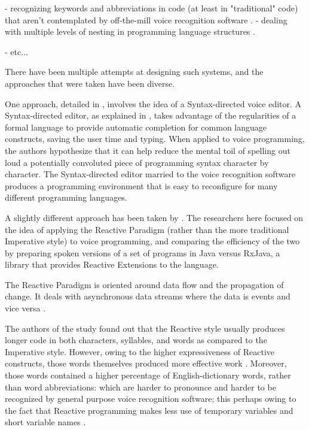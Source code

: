 - recognizing keywords and abbreviations in code (at least in "traditional" code) that aren't contemplated by off-the-mill voice recognition software \cite{arnold2000programming}.
- dealing with multiple levels of nesting in programming language structures \cite{arnold2000programming}.

- etc...

There have been multiple attempts at designing such systems, and the approaches that were taken have been diverse.

One approach, detailed in \cite{arnold2000programming}, involves the idea of a Syntax-directed voice editor. A Syntax-directed editor, as explained in \cite{arnold2000programming}, takes advantage of the regularities of a formal language to provide automatic completion for common language constructs, saving the user time and typing. When applied to voice programming, the authors hypothesize that it can help reduce the mental toil of spelling out loud a potentially convoluted piece of programming syntax character by character. The Syntax-directed editor married to the voice recognition software produces a programming environment that is easy to reconfigure for many different programming languages.

A slightly different approach has been taken by \cite{lagergren2021programming}. The researchers here focused on the idea of applying the Reactive Paradigm (rather than the more traditional Imperative style) to voice programming, and comparing the efficiency of the two by preparing spoken versions of a set of programs in Java versus RxJava, a library that provides Reactive Extensions to the language.

The Reactive Paradigm is oriented around data flow and the propagation of change. It deals with asynchronous data streams where the data is events and vice versa \cite{lagergren2021programming}.

The authors of the study found out that the Reactive style usually produces longer code in both characters, syllables, and words as compared to the Imperative style. However, owing to the higher expressiveness of Reactive constructs, those words themselves produced more effective work \cite{lagergren2021programming}. Moreover, those words contained a higher percentage of English-dictionary words, rather than word abbreviations: which are harder to pronounce and harder to be recognized by general purpose voice recognition software; this perhaps owing to the fact that Reactive programming makes less use of temporary variables and short variable names \cite{lagergren2021programming}.

